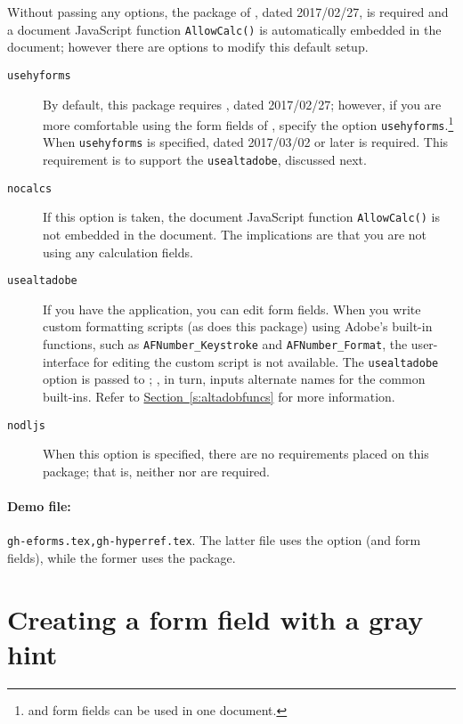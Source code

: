 \documentclass{article}
\begin{document}
Without passing any options, the  package of \AEB, dated
2017/02/27, is required and a document JavaScript function
\texttt{AllowCalc()} is automatically embedded in the document; however there
are options to modify this default setup.
\begin{description}
    \item[\texttt{usehyforms}] By default, this package requires
        , dated 2017/02/27; however, if you are more
        comfortable using the form fields of , specify the
        option \texttt{usehyforms}.\footnote{ and
         form fields can be used in one document.} When
        \texttt{usehyforms} is specified,  dated 2017/03/02 or
        later is required. This requirement is to support the
        \texttt{usealtadobe}, discussed next.
    \item[\texttt{nocalcs}] If this option is taken, the document
        JavaScript function \texttt{AllowCalc()} is not embedded in the document. The
        implications are that you are not using any calculation fields.
    \item[\texttt{usealtadobe}] If you have the  application,
        you can edit form fields. When you write custom formatting scripts
        (as does this package) using Adobe's built-in functions, such as
        \texttt{AFNumber\_Keystroke} and \texttt{AFNumber\_Format}, the
        user-interface for editing the custom script is not available. The
        \texttt{usealtadobe} option is passed to ;
        , in turn, inputs alternate names for the common
         built-ins. Refer to
        \hyperref[s:altadobfuncs]{Section~\ref*{s:altadobfuncs}} for more
        information.

    \item[\texttt{nodljs}] When this option is specified, there are no
        requirements placed on this package; that is, neither 
        nor  are required.
\end{description}

\paragraph*{Demo file:} \texttt{gh-eforms.tex,\;gh-hyperref.tex}. The latter file
uses the  option (and  form fields), while the former uses the  package.

\section{Creating a form field with a gray hint}
\end{document}
